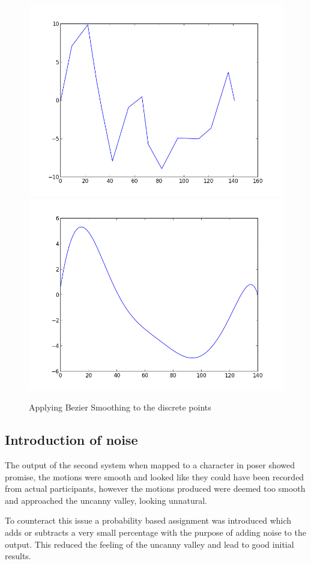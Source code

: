 \documentclass[bsc,frontabs,twoside,singlespacing,parskip]{infthesis}
\begin{document}

\begin{figure}
	\includegraphics[width=.5\textwidth]{figure_1.png}
	\includegraphics[width=.5\textwidth]{figure_2.png}
	\caption{Applying Bezier Smoothing to the discrete points}
\end{figure}

\subsection{Introduction of noise}

The output of the second system when mapped to a character in poser showed promise, the motions were smooth and looked like they could have been recorded from actual participants, however the motions produced were deemed too smooth and approached the uncanny valley, looking unnatural.

To counteract this issue a probability based assignment was introduced which adds or subtracts a very small percentage with the purpose of adding noise to the output. This reduced the feeling of the uncanny valley and lead to good initial results.

\end{document}
